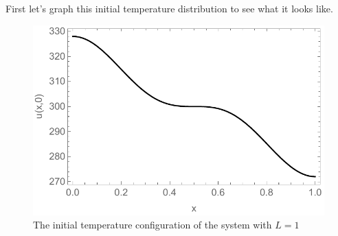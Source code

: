 \documentclass[a4paper, 11pt]{article}
\newenvironment{solution}{%
	\begin{list}{}{%
			\setlength{\topsep}{0pt}%
			\setlength{\leftmargin}{0.5cm}%
			\setlength{\rightmargin}{0.5cm}%
			\setlength{\listparindent}{\parindent}%
			\setlength{\itemindent}{\parindent}%
			\setlength{\parsep}{\parskip}%
		}%
		\item[]}{\end{list}}
\begin{document}
\begin{enumerate}[leftmargin=0em]
      \begin{solution}
        First let's graph this initial temperature distribution to see what it
        looks like.
        \begin{figure}[!hbt]
          \centering
          \includegraphics[width=.75\columnwidth]{initial_configuration}
          \caption{The initial temperature configuration of the system with
            $L=1$}
          \label{fig:initial_configuration}
        \end{figure}
				

\end{solution}
\end{enumerate}
\end{document}
